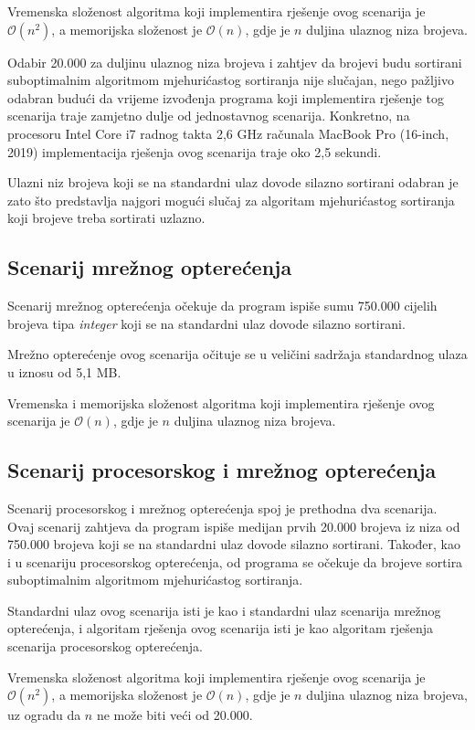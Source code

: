 \documentclass[times, utf8, diplomski]{fer}
\begin{document}
Vremenska složenost algoritma koji implementira rješenje ovog scenarija je $\mathcal{O}(n^2)$, a memorijska složenost je $\mathcal{O}(n)$, gdje je $n$ duljina ulaznog niza brojeva.

Odabir 20.000 za duljinu ulaznog niza brojeva i zahtjev da brojevi budu sortirani suboptimalnim algoritmom mjehurićastog sortiranja nije slučajan, nego pažljivo odabran budući da vrijeme izvođenja programa koji implementira rješenje tog scenarija traje zamjetno dulje od jednostavnog scenarija. Konkretno, na procesoru Intel Core i7 radnog takta 2,6 GHz računala MacBook Pro (16-inch, 2019)  implementacija rješenja ovog scenarija traje oko 2,5 sekundi.

Ulazni niz brojeva koji se na standardni ulaz dovode silazno sortirani odabran je zato što predstavlja najgori mogući slučaj  za algoritam mjehurićastog sortiranja koji brojeve treba sortirati uzlazno.

\subsection{Scenarij mrežnog opterećenja}
Scenarij mrežnog opterećenja očekuje da program ispiše sumu 750.000 cijelih brojeva tipa \textit{integer} koji se na standardni ulaz dovode silazno sortirani.

Mrežno opterećenje ovog scenarija očituje se u veličini sadržaja standardnog ulaza u iznosu od 5,1 MB.

Vremenska i memorijska složenost algoritma koji implementira rješenje ovog scenarija je $\mathcal{O}(n)$, gdje je $n$ duljina ulaznog niza brojeva.

\subsection{Scenarij procesorskog i mrežnog opterećenja}
Scenarij procesorskog i mrežnog opterećenja spoj je prethodna dva scenarija. Ovaj scenarij zahtjeva da program ispiše medijan prvih 20.000 brojeva iz niza od 750.000 brojeva koji se na standardni ulaz dovode silazno sortirani. Također, kao i u scenariju procesorskog opterećenja, od programa se očekuje da brojeve sortira suboptimalnim algoritmom mjehurićastog sortiranja.

Standardni ulaz ovog scenarija isti je kao i standardni ulaz scenarija mrežnog opterećenja, i algoritam rješenja ovog scenarija isti je kao algoritam rješenja scenarija procesorskog opterećenja.

Vremenska složenost algoritma koji implementira rješenje ovog scenarija je $\mathcal{O}(n^2)$, a memorijska složenost je $\mathcal{O}(n)$, gdje je $n$ duljina ulaznog niza brojeva, uz ogradu da $n$ ne može biti veći od 20.000.
\end{document}
